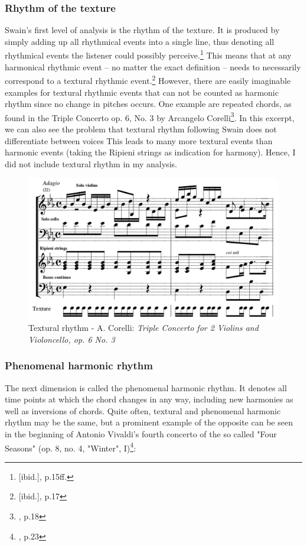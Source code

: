 \documentclass[a4paper,12pt]{report}
\begin{document}
\subsubsection{Rhythm of the texture}
Swain's first level of analysis is the rhythm of the texture. It is produced by simply adding up all rhythmical events into a single line, thus denoting all rhythmical events the listener could possibly perceive.\footnote{[ibid.], p.15ff.} This means that at any harmonical rhythmic event -- no matter the exact definition -- needs to necessarily correspond to a textural rhythmic event.\footnote{[ibid.], p.17} However, there are easily imaginable examples for textural rhythmic events that can not be counted as harmonic rhythm since no change in pitches occurs. One example are repeated chords, as found in the Triple Concerto op. 6, No. 3 by Arcangelo Corelli\footnote{\cite{swain2002harmonic}, p.18}. In this excerpt, we can also see the problem that textural rhythm following Swain does not differentiate between voices This leads to many more textural events than harmonic events (taking the Ripieni strings as indication for harmony). Hence, I did not include textural rhythm in my analysis.
\begin{figure}[h]
\centering
\includegraphics[scale=0.35]{Corelli_triple_concerto.jpg}
\caption{Textural rhythm - A. Corelli: \textit{Triple Concerto for 2 Violins and Violoncello, op. 6 No. 3}}
\end{figure}


\subsubsection{Phenomenal harmonic rhythm}
The next dimension is called the phenomenal harmonic rhythm. It denotes all time points at which the chord changes in any way, including new harmonies as well as inversions of chords. Quite often, textural and phenomenal harmonic rhythm may be the same, but a prominent example of the opposite can be seen in the beginning of Antonio Vivaldi's fourth concerto of the so called "Four Seasons" (op. 8, no. 4, "Winter", I)\footnote{\cite{swain2002harmonic}, p.23}:
\end{document}
